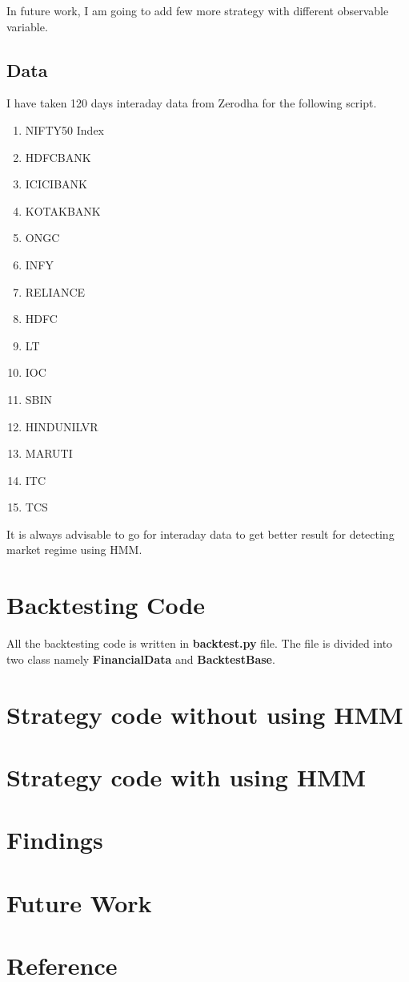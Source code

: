\documentclass{report}
\begin{document}
In future work, I am going to add few more strategy with different observable variable.

\section{Data}

I have taken 120 days interaday data from Zerodha for the following script.
\begin{enumerate}
  	\item NIFTY50 Index
  	\item HDFCBANK
	\item ICICIBANK
	\item KOTAKBANK
	\item ONGC
	\item INFY
	\item RELIANCE
	\item HDFC
	\item LT
	\item IOC
	\item SBIN
	\item HINDUNILVR
	\item MARUTI
	\item ITC
	\item TCS
\end{enumerate}
It is always advisable to go for interaday data to get better result for detecting market regime using HMM.


\chapter{Backtesting Code}
All the backtesting code is written in \textbf{backtest.py} file. The file is divided into two class namely \textbf{FinancialData} and \textbf{BacktestBase}.


\chapter{Strategy code without using HMM}
\chapter{Strategy code with using HMM}
\chapter{Findings}
\chapter{Future Work}
\chapter{Reference}
\end{document}
